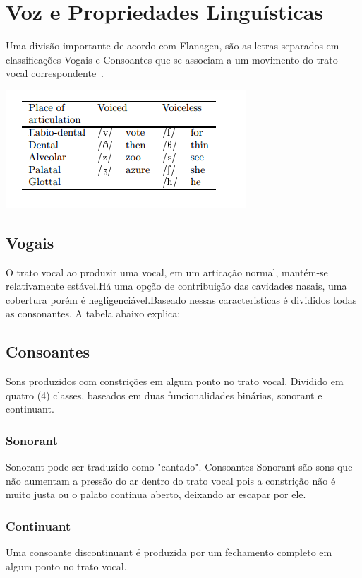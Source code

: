 	
	
	\section{Voz e Propriedades Linguísticas}
	Uma divisão importante de acordo com Flanagen, são as letras separados em classificações Vogais e Consoantes que se associam a um movimento do trato vocal correspondente~\cite{JFlanagan}.
	
	\includegraphics{tabelaConsoantes.png}
	
	\subsection{Vogais}
	
	O trato vocal ao produzir uma vocal, em um articação normal, mantém-se relativamente estável.Há uma opção de contribuição das cavidades nasais, uma cobertura porém é negligenciável.Baseado nessas caracteristicas é divididos todas as consonantes. A tabela abaixo explica:
	
	
	\subsection{Consoantes}
	Sons produzidos com constrições em algum ponto no trato vocal. Dividido em quatro (4) classes, baseados em duas funcionalidades binárias, sonorant e continuant.
	
	
	\subsubsection{Sonorant}	 
	Sonorant pode ser traduzido como "cantado". Consoantes Sonorant são sons que não aumentam a pressão do ar dentro do trato vocal pois a constrição não é muito justa ou o palato continua aberto, deixando ar escapar por ele.
	
	\subsubsection{Continuant}
	Uma consoante discontinuant é produzida por um fechamento completo em algum ponto no trato vocal.
	

 

